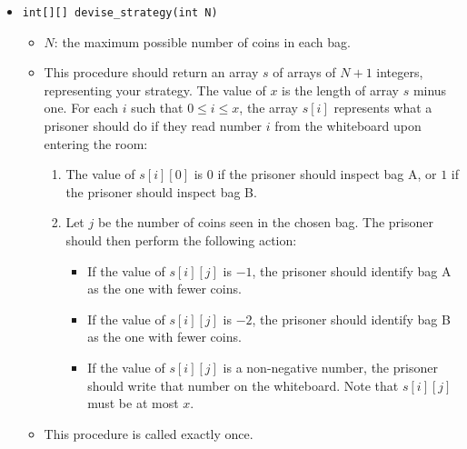 \begin{itemize}
    \item \texttt{int[][] devise\_strategy(int N)}
\begin{itemize}

\item $N$: the maximum possible number of coins in each bag.
\item This procedure should return an array $s$ of arrays of $N + 1$ integers, representing your strategy.
The value of $x$ is the length of array $s$ minus one.
For each $i$ such that $0 \le i \le x$, the array $s[i]$ represents what a prisoner should do if they read number $i$ from the whiteboard upon entering the room:
    \begin{enumerate}
        \item The value of $s[i][0]$ is $0$ if the prisoner should inspect bag A, or $1$ if the prisoner should inspect bag B.
        \item Let $j$ be the number of coins seen in the chosen bag. The prisoner should then perform the following action:
        \begin{itemize}
            \item  If the value of $s[i][j]$ is $-1$, the prisoner should identify bag A as the one with fewer coins.
    \item If the value of $s[i][j]$ is $-2$, the prisoner should identify bag B as the one with fewer coins.
    \item If the value of $s[i][j]$ is a non-negative number, the prisoner should write that number on the whiteboard. Note that $s[i][j]$ must be at most $x$.
    \end{itemize}
    \end{enumerate}
\item This procedure is called exactly once.

\end{itemize}
\end{itemize}

